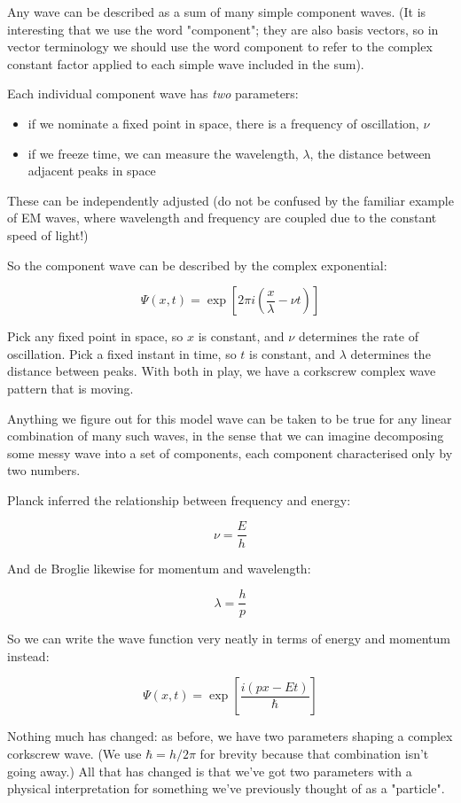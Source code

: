 Any wave can be described as a sum of many simple component waves. (It is interesting that we use the word "component"; they are also basis vectors, so in vector terminology we should use the word component to refer to the complex constant factor applied to each simple wave included in the sum).

Each individual component wave has \textit{two} parameters:

\begin{itemize}
  \item if we nominate a fixed point in space, there is a frequency of oscillation, $\nu$
  \item if we freeze time, we can measure the wavelength, $\lambda$, the distance between adjacent peaks in space
\end{itemize}

These can be independently adjusted (do not be confused by the familiar example of EM waves, where wavelength and frequency are coupled due to the constant speed of light!)

So the component wave can be described by the complex exponential:

$$
\Psi(x, t) = \exp \left[ 2\pi i(\frac{x}{\lambda} - \nu t) \right]
$$

Pick any fixed point in space, so $x$ is constant, and $\nu$ determines the rate of oscillation. Pick a fixed instant in time, so $t$ is constant, and $\lambda$ determines the distance between peaks. With both in play, we have a corkscrew complex wave pattern that is moving.

Anything we figure out for this model wave can be taken to be true for any linear combination of many such waves, in the sense that we can imagine decomposing some messy wave into a set of components, each component characterised only by two numbers.

Planck inferred the relationship between frequency and energy:

$$\nu = \frac{E}{h}$$

And de Broglie likewise for momentum and wavelength:

$$\lambda = \frac{h}{p}$$

So we can write the wave function very neatly in terms of energy and momentum instead:

$$
\Psi(x, t) = \exp \left[ {\frac{i(px - Et)}{\hbar}} \right]
$$

Nothing much has changed: as before, we have two parameters shaping a complex corkscrew wave. (We use $\hbar = h/2\pi$ for brevity because that combination isn't going away.) All that has changed is that we've got two parameters with a physical interpretation for something we've previously thought of as a "particle".

